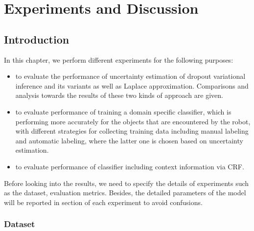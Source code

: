 
\chapter{Experiments and Discussion}

\section{Introduction}
In this chapter, we perform different experiments for the following purposes:
\begin{itemize}
	\item to evaluate the performance of uncertainty estimation of dropout variational inference and its variants as well as Laplace approximation. Comparisons and analysis towards the results of these two kinds of approach are given.
	
	\item to evaluate performance of training a domain specific classifier, which is performing more accurately for the objects that are encountered by the robot, with different strategies for collecting training data including manual labeling and automatic labeling, where the latter one is chosen based on uncertainty estimation.
	
	\item to evaluate performance of classifier including context information via CRF.
\end{itemize}

Before looking into the results, we need to specify the details of experiments such as the dataset, evaluation metrics. Besides, the detailed parameters of the model will be reported in section of each experiment to avoid confusions.

\subsection{Dataset}
